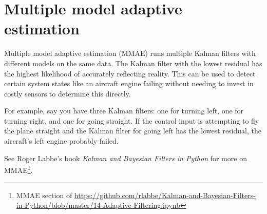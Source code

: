 \section{Multiple model adaptive estimation}

Multiple model adaptive estimation (MMAE) runs multiple Kalman filters with
different \glspl{model} on the same data. The Kalman filter with the lowest
residual has the highest likelihood of accurately reflecting reality. This can
be used to detect certain \gls{system} \glspl{state} like an aircraft engine
failing without needing to invest in costly sensors to determine this directly.

For example, say you have three Kalman filters: one for turning left, one for
turning right, and one for going straight. If the \gls{control input} is
attempting to fly the plane straight and the Kalman filter for going left has
the lowest residual, the aircraft's left engine probably failed.

See Roger Labbe's book \textit{Kalman and Bayesian Filters in Python} for more
on MMAE\footnote{MMAE section of
\url{https://github.com/rlabbe/Kalman-and-Bayesian-Filters-in-Python/blob/master/14-Adaptive-Filtering.ipynb}}.

